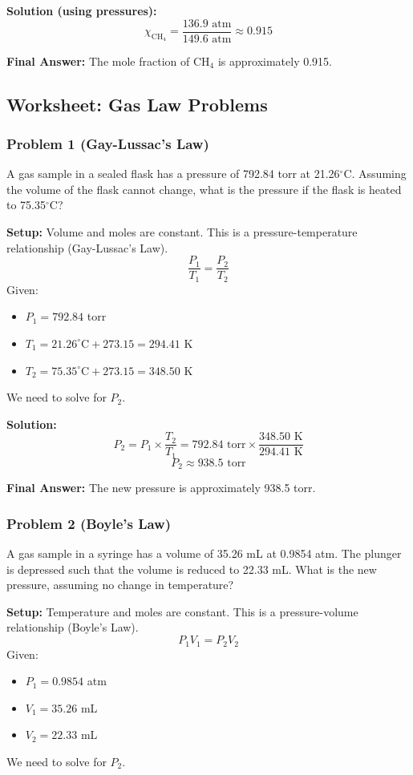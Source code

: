 \documentclass{article}
\begin{document}
\textbf{Solution (using pressures):}
\[ \chi_{\text{CH}_4} = \frac{136.9 \text{ atm}}{149.6 \text{ atm}} \approx 0.915 \]

\textbf{Final Answer:} The mole fraction of CH$_4$ is approximately 0.915.

\subsection{Worksheet: Gas Law Problems}

\subsubsection{Problem 1 (Gay-Lussac's Law)}
A gas sample in a sealed flask has a pressure of 792.84 torr at 21.26$^{\circ}$C. Assuming the volume of the flask cannot change, what is the pressure if the flask is heated to 75.35$^{\circ}$C?

\textbf{Setup:}
Volume and moles are constant. This is a pressure-temperature relationship (Gay-Lussac's Law).
\[ \frac{P_1}{T_1} = \frac{P_2}{T_2} \]
Given:
\begin{itemize}
    \item $P_1 = 792.84$ torr
    \item $T_1 = 21.26^{\circ}\text{C} + 273.15 = 294.41$ K
    \item $T_2 = 75.35^{\circ}\text{C} + 273.15 = 348.50$ K
\end{itemize}
We need to solve for $P_2$.

\textbf{Solution:}
\[ P_2 = P_1 \times \frac{T_2}{T_1} = 792.84 \text{ torr} \times \frac{348.50 \text{ K}}{294.41 \text{ K}} \]
\[ P_2 \approx 938.5 \text{ torr} \]

\textbf{Final Answer:} The new pressure is approximately 938.5 torr.

\subsubsection{Problem 2 (Boyle's Law)}
A gas sample in a syringe has a volume of 35.26 mL at 0.9854 atm. The plunger is depressed such that the volume is reduced to 22.33 mL. What is the new pressure, assuming no change in temperature?

\textbf{Setup:}
Temperature and moles are constant. This is a pressure-volume relationship (Boyle's Law).
\[ P_1V_1 = P_2V_2 \]
Given:
\begin{itemize}
    \item $P_1 = 0.9854$ atm
    \item $V_1 = 35.26$ mL
    \item $V_2 = 22.33$ mL
\end{itemize}
We need to solve for $P_2$.
\end{document}
